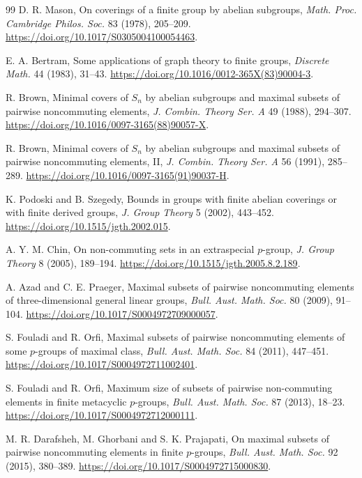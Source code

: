\documentclass[11pt]{article}
\theoremstyle{definition}
\theoremstyle{remark}
\begin{document}
\begin{thebibliography}{99}
D. R. Mason, On coverings of a finite group by abelian subgroups, \emph{Math. Proc. Cambridge Philos. Soc.} 83 (1978), 205--209. \url{https://doi.org/10.1017/S0305004100054463}.

E. A. Bertram, Some applications of graph theory to finite groups, \emph{Discrete Math.} 44 (1983), 31--43. \url{https://doi.org/10.1016/0012-365X(83)90004-3}.

R. Brown, Minimal covers of $S_n$ by abelian subgroups and maximal subsets of pairwise noncommuting elements, \emph{J. Combin. Theory Ser. A} 49 (1988), 294--307. \url{https://doi.org/10.1016/0097-3165(88)90057-X}.

R. Brown, Minimal covers of $S_n$ by abelian subgroups and maximal subsets of pairwise noncommuting elements, II, \emph{J. Combin. Theory Ser. A} 56 (1991), 285--289. \url{https://doi.org/10.1016/0097-3165(91)90037-H}.

K. Podoski and B. Szegedy, Bounds in groups with finite abelian coverings or with finite derived groups, \emph{J. Group Theory} 5 (2002), 443--452. \url{https://doi.org/10.1515/jgth.2002.015}.

A. Y. M. Chin, On non-commuting sets in an extraspecial $p$-group, \emph{J. Group Theory} 8 (2005), 189--194. \url{https://doi.org/10.1515/jgth.2005.8.2.189}.

A. Azad and C. E. Praeger, Maximal subsets of pairwise noncommuting elements of three-dimensional general linear groups, \emph{Bull. Aust. Math. Soc.} 80 (2009), 91--104. \url{https://doi.org/10.1017/S0004972709000057}.

S. Fouladi and R. Orfi, Maximal subsets of pairwise noncommuting elements of some $p$-groups of maximal class, \emph{Bull. Aust. Math. Soc.} 84 (2011), 447--451. \url{https://doi.org/10.1017/S0004972711002401}.

S. Fouladi and R. Orfi, Maximum size of subsets of pairwise non-commuting elements in finite metacyclic $p$-groups, \emph{Bull. Aust. Math. Soc.} 87 (2013), 18--23. \url{https://doi.org/10.1017/S0004972712000111}.

M. R. Darafsheh, M. Ghorbani and S. K. Prajapati, On maximal subsets of pairwise noncommuting elements in finite $p$-groups, \emph{Bull. Aust. Math. Soc.} 92 (2015), 380--389. \url{https://doi.org/10.1017/S0004972715000830}.


\end{thebibliography}
\end{document}
